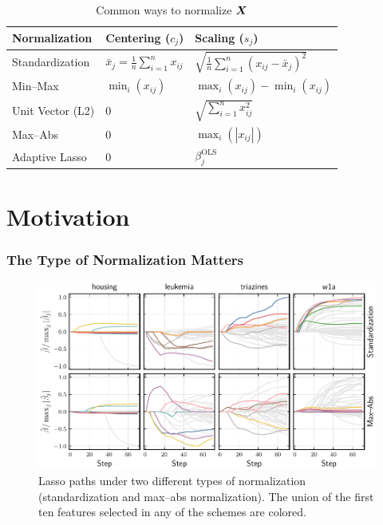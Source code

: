 \documentclass[10pt]{beamer}
\begin{document}
\begin{frame}[c]
  \begin{table}[hbt]
    \centering
    \caption{Common ways to normalize \(\boldsymbol{X}\)}
    \begin{tabular}{lll}
      \toprule
      Normalization    & Centering (\(c_{j}\))                          & Scaling (\(s_j\))                                         \\
      \midrule
      Standardization  & \(\bar{x}_j = \frac{1}{n}\sum_{i=1}^n x_{ij}\) & \(\sqrt{\frac{1}{n}\sum_{i=1}^n (x_{ij} - \bar{x}_j)^2}\) \\
      \addlinespace
      Min--Max         & \(\min_i(x_{ij})\)                             & \(\max_i(x_{ij}) - \min_i(x_{ij})\)                       \\
      \addlinespace
      Unit Vector (L2) & 0                                              & \(\sqrt{\sum_{i=1}^n x_{ij}^2}\)                          \\
      \addlinespace
      Max--Abs         & 0                                              & \(\max_i(|x_{ij}|)\)                                      \\
      \addlinespace
      Adaptive Lasso   & 0                                              & \(\beta_j^\text{OLS}\)                                    \\
      \bottomrule
    \end{tabular}
  \end{table}
\end{frame}

\section{Motivation}

\begin{frame}[c]
  \frametitle{The Type of Normalization Matters}

  \begin{figure}[htpb]
    \centering
    \includegraphics[width=\textwidth]{figures/realdata_paths.pdf}
    \caption{%
      Lasso paths under two different types of normalization (standardization and max--abs normalization). The union of the first ten features selected in any of the schemes are colored.
    }
  \end{figure}

\end{frame}
\end{document}

